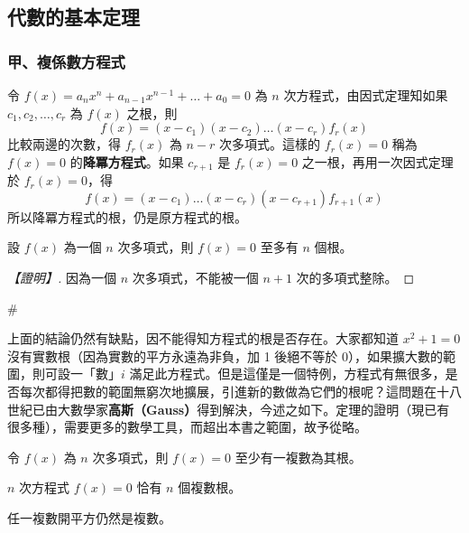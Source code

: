 \subsection{代數的基本定理}\label{sec:b6s-2-2}
\resetsectcounters

\subsubsection*{甲、複係數方程式}\label{subsec:b6s-2-2-a}

令 $f(x) = a_n x^n + a_{n-1} x^{n-1} + \dots + a_0 = 0$ 為 $n$ 次方程式，由因式定理知如果 $c_1, c_2, \dots, c_r$ 為 $f(x)$ 之根，則
\[ f(x) = (x-c_1)(x-c_2)\dots(x-c_r)f_r(x) \]
比較兩邊的次數，得 $f_r(x)$ 為 $n-r$ 次多項式。這樣的 $f_r(x)=0$ 稱為 $f(x)=0$ 的\textbf{降冪方程式}。如果 $c_{r+1}$ 是 $f_r(x)=0$ 之一根，再用一次因式定理於 $f_r(x)=0$，得
\[ f(x) = (x-c_1)\dots(x-c_r)(x-c_{r+1})f_{r+1}(x) \]
所以降冪方程式的根，仍是原方程式的根。

\begin{theorem}\label{thm:b6s-2-roots-bound}
設 $f(x)$ 為一個 $n$ 次多項式，則 $f(x)=0$ 至多有 $n$ 個根。
\end{theorem}

\begin{proof}[【證明】]
因為一個 $n$ 次多項式，不能被一個 $n+1$ 次的多項式整除。
\end{proof}\hfill$\#$

上面的結論仍然有缺點，因不能得知方程式的根是否存在。大家都知道 $x^2+1=0$ 沒有實數根（因為實數的平方永遠為非負，加 1 後絕不等於 0），如果擴大數的範圍，則可設一「數」$i$ 滿足此方程式。但是這僅是一個特例，方程式有無很多，是否每次都得把數的範圍無窮次地擴展，引進新的數做為它們的根呢？這問題在十八世紀已由大數學家\textbf{高斯（Gauss）}得到解決，今述之如下。定理的證明（現已有很多種），需要更多的數學工具，而超出本書之範圍，故予從略。

\begin{theorem}[代數的基本定理]\label{thm:b6s-2-fta}
令 $f(x)$ 為 $n$ 次多項式，則 $f(x)=0$ 至少有一複數為其根。
\end{theorem}

\begin{corollary}\label{cor:b6s-2-n-roots}
$n$ 次方程式 $f(x)=0$ 恰有 $n$ 個複數根。
\end{corollary}

\begin{discussion}\label{disc:b6s-2-1}
任一複數開平方仍然是複數。
\end{discussion}


